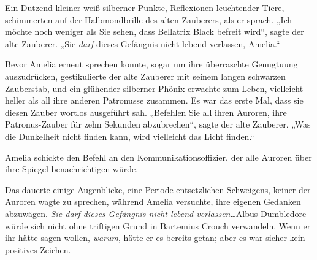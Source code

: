 Ein Dutzend kleiner weiß-silberner Punkte, Reflexionen leuchtender Tiere, schimmerten auf der Halbmondbrille des alten Zauberers, als er sprach. „Ich möchte noch weniger als Sie sehen, dass Bellatrix Black befreit wird“, sagte der alte Zauberer. „Sie \emph{darf} dieses Gefängnis nicht lebend verlassen, Amelia.“

Bevor Amelia erneut sprechen konnte, sogar um ihre überraschte Genugtuung auszudrücken, gestikulierte der alte Zauberer mit seinem langen schwarzen Zauberstab, und ein glühender silberner Phönix erwachte zum Leben, vielleicht heller als all ihre anderen Patronusse zusammen. Es war das erste Mal, dass sie diesen Zauber wortlos ausgeführt sah. „Befehlen Sie all ihren Auroren, ihre Patronus-Zauber für zehn Sekunden abzubrechen“, sagte der alte Zauberer. „Was die Dunkelheit nicht finden kann, wird vielleicht das Licht finden.“

Amelia schickte den Befehl an den Kommunikationsoffizier, der alle Auroren über ihre Spiegel benachrichtigen würde.

Das dauerte einige Augenblicke, eine Periode entsetzlichen Schweigens, keiner der Auroren wagte zu sprechen, während Amelia versuchte, ihre eigenen Gedanken abzuwägen. \emph{Sie darf dieses Gefängnis nicht lebend verlassen}…Albus Dumbledore würde sich nicht ohne triftigen Grund in Bartemius Crouch verwandeln. Wenn er ihr hätte sagen wollen, \emph{warum}, hätte er es bereits getan; aber es war sicher kein positives Zeichen.

